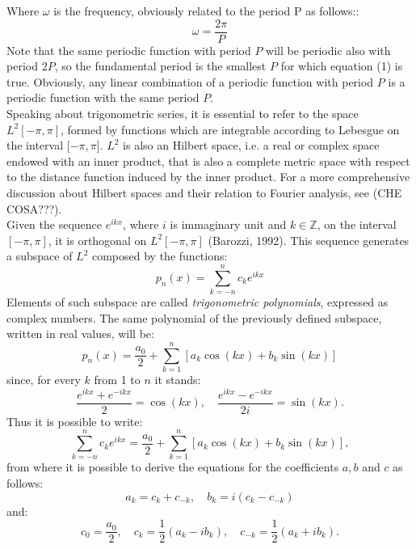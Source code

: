 \documentclass{article}
\begin{document}
Where $\omega$ is the frequency, obviously related to the period P as follows::
\begin{equation}
\omega=\frac{2\pi}{P}
\end{equation}
Note that the same periodic function with period $P$ will be periodic also with period $2P$, so the fundamental period is the smallest $P$ for which equation (1) is true. Obviously, any linear combination of a periodic function with period $P$ is a periodic function with the same period $P$.\\Speaking about trigonometric series, it is essential to refer to the space $L^2[-\pi,\pi]$, formed by functions which are integrable according to Lebesgue on the interval $[-\pi,\pi$]. $L^2$ is also an Hilbert space, i.e. a real or complex space endowed with an inner product, that is also a complete metric space with respect to the distance function induced by the inner product. For a more comprehensive discussion about Hilbert spaces and their relation to Fourier analysis, see (CHE COSA???).\\Given the sequence $e^{ikx}$, where $i$ is immaginary unit and $k\in\mathbb{Z}$, on the interval $[-\pi,\pi]$, it is orthogonal on $L^2[-\pi,\pi]$ (Barozzi, 1992). This sequence generates a subspace of $L^2$ composed by the functions:
\begin{equation}
p_n(x)=\sum_{k=-n}^{n}c_k e^{ikx}
\end{equation}
Elements of such subspace are called \textit{trigonometric polynomials}, expressed as complex numbers. The same polynomial of the previously defined subspace, written in real values, will be:
\begin{equation}
p_n(x)=\frac{a_0}{2}+\sum_{k=1}^{n}[a_k \cos(kx)+b_k \sin(kx)]
\end{equation}
since, for every $k$ from 1 to $n$ it stands:
\begin{equation}
\frac{e^{ikx}+e^{-ikx}}{2}=\cos(kx), \quad \frac{e^{ikx}-e^{-ikx}}{2i}=\sin(kx).
\end{equation}
Thus it is possible to write:
\begin{equation}
\sum_{k=-n}^{n}c_k e^{ikx}=\frac{a_0}{2}+\sum_{k=1}^{n}[a_k \cos(kx)+b_k \sin(kx)],
\end{equation}
from where it is possible to derive the equations for the coefficients $a,b$ and $c$ as follows:
\begin{equation}
a_k=c_k+c_{-k}, \quad b_k=i(c_k-c_{-k})
\end{equation}
and:
\begin{equation}
c_0=\frac{a_0}{2}, \quad c_k=\frac{1}{2}(a_k-ib_k), \quad c_{-k}=\frac{1}{2}(a_k+ib_k).
\end{equation}
\end{document}
